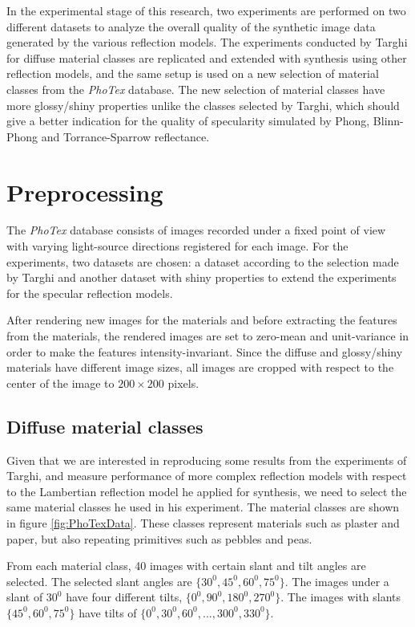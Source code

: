 \hypertarget{experiments}{
}

In the experimental stage of this research, two experiments are performed on two different datasets to analyze the overall quality of the synthetic image data generated by the various reflection models. The experiments conducted by Targhi for diffuse material classes are replicated and extended with synthesis using other reflection models, and the same setup is used on a new selection of material classes from the {\it PhoTex} database. The new selection of material classes have more glossy/shiny properties unlike the classes selected by Targhi, which should give a better indication for the quality of specularity simulated by Phong, Blinn-Phong and Torrance-Sparrow reflectance. 

\section{Preprocessing}\label{sec:preprocessing}
The {\it PhoTex} database consists of images recorded under a fixed point of view with varying light-source directions registered for each image. For the experiments, two datasets are chosen: a dataset according to the selection made by Targhi and another dataset with shiny properties to extend the experiments for the specular reflection models. 

After rendering new images for the materials and before extracting the features from the materials, the rendered images are set to zero-mean and unit-variance in order to make the features intensity-invariant. Since the diffuse and glossy/shiny materials have different image sizes, all images are cropped with respect to the center of the image to $200 \times 200$ pixels.

\subsection{Diffuse material classes}
Given that we are interested in reproducing some results from the experiments of Targhi, and measure performance of more complex reflection models with respect to the Lambertian reflection model he applied for synthesis, we need to select the same material classes he used in his experiment. The material classes are shown in figure \ref{fig:PhoTexData}. These classes represent materials such as plaster and paper, but also repeating primitives such as pebbles and peas.

From each material class, 40 images with certain slant and tilt angles are selected. The selected slant angles are $\{30^0, 45^0,60^0,75^0\}$. The images under a slant of $30^0$ have four different tilts, $\{0^0, 90^0, 180^0, 270^0\}$. The images with slants $\{45^0,60^0,75^0\}$ have tilts of $\{0^0,30^0,60^0,..., 300^0,330^0\}$. 

